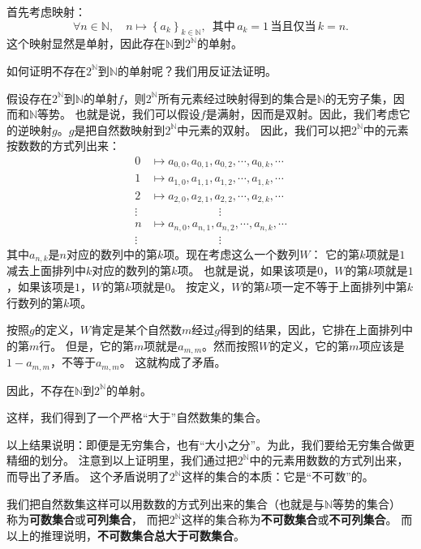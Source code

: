 \documentclass[12pt,UTF8]{ctexbook}
\begin{document}
首先考虑映射：
$$ \forall n\in\mathbb{N}, \quad n \mapsto \left\{a_k\right\}_{k\in\mathbb{N}}, \,\,\, \mbox{其中} \, a_k = 1 \,\mbox{当且仅当} \, k = n . $$
这个映射显然是单射，因此存在$\mathbb{N}$到$2^\mathbb{N}$的单射。

如何证明不存在$2^\mathbb{N}$到$\mathbb{N}$的单射呢？我们用反证法证明。

假设存在$2^\mathbb{N}$到$\mathbb{N}$的单射$f$，则$2^\mathbb{N}$所有元素经过映射得到的集合是$\mathbb{N}$的无穷子集，因而和$\mathbb{N}$等势。
也就是说，我们可以假设$f$是满射，因而是双射。因此，我们考虑它的逆映射$g$。$g$是把自然数映射到$2^\mathbb{N}$中元素的双射。
因此，我们可以把$2^\mathbb{N}$中的元素按数数的方式列出来：
\begin{align*}
    0 &\mapsto a_{0,0}, a_{0,1}, a_{0,2}, \cdots , a_{0,k}, \cdots  \\
    1 &\mapsto a_{1,0}, a_{1,1}, a_{1,2}, \cdots , a_{1,k}, \cdots  \\
    2 &\mapsto a_{2,0}, a_{2,1}, a_{2,2}, \cdots , a_{2,k}, \cdots  \\
    \vdots & \qquad \qquad\qquad \vdots  \\
    n &\mapsto a_{n,0}, a_{n,1}, a_{n,2}, \cdots , a_{n,k}, \cdots  \\
    \vdots & \qquad \qquad\qquad \vdots  
\end{align*}
其中$a_{n,k}$是$n$对应的数列中的第$k$项。现在考虑这么一个数列$W$：
它的第$k$项就是$1$减去上面排列中$k$对应的数列的第$k$项。
也就是说，如果该项是$0$，$W$的第$k$项就是$1$，如果该项是$1$，$W$的第$k$项就是$0$。
按定义，$W$的第$k$项一定不等于上面排列中第$k$行数列的第$k$项。

按照$g$的定义，$W$肯定是某个自然数$m$经过$g$得到的结果，因此，它排在上面排列中的第$m$行。
但是，它的第$m$项就是$a_{m,m}$。然而按照$W$的定义，它的第$m$项应该是$1 - a_{m,m}$，不等于$a_{m,m}$。
这就构成了矛盾。

因此，不存在$\mathbb{N}$到$2^\mathbb{N}$的单射。

这样，我们得到了一个严格“大于”自然数集的集合。

以上结果说明：即便是无穷集合，也有“大小之分”。为此，我们要给无穷集合做更精细的划分。
注意到以上证明里，我们通过把$2^\mathbb{N}$中的元素用数数的方式列出来，而导出了矛盾。
这个矛盾说明了$2^\mathbb{N}$这样的集合的本质：它是“不可数”的。

我们把自然数集这样可以用数数的方式列出来的集合（也就是与$\mathbb{N}$等势的集合）
称为\textbf{可数集合}或\textbf{可列集合}，
而把$2^\mathbb{N}$这样的集合称为\textbf{不可数集合}或\textbf{不可列集合}。
而以上的推理说明，\textbf{不可数集合总大于可数集合}。
\end{document}
